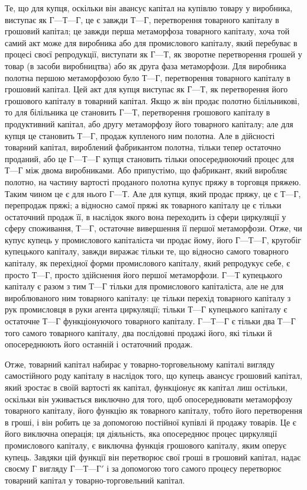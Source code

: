 Те, що для купця, оскільки він авансує капітал на купівлю
товару у виробника, виступає як $Г — Т — Г$, це є завжди $Т — Г$,
перетворення товарного капіталу в грошовий капітал; це завжди
перша метаморфоза товарного капіталу, хоча той самий акт
може для виробника або для промислового капіталу, який перебуває в процесі своєї репродукції,
виступати як $Г — Т$, як зворотне перетворення грошей у товар (в засоби виробництва) або як друга фаза
метаморфози. Для виробника полотна першою
метаморфозою було $Т — Г$, перетворення товарного капіталу
в грошовий капітал. Цей акт для купця виступає як $Г — Т$, як
перетворення його грошового капіталу в товарний капітал. Якщо ж
він продає полотно білільникові, то для білільника це становить $Г — Т$, перетворення грошового
капіталу в продуктивний
капітал, або другу метаморфозу його товарного капіталу; але
для купця це становить $Т — Г$, продаж купленого ним полотна.
Але в дійсності товарний капітал, вироблений фабрикантом полотна, тільки тепер остаточно проданий,
або це $Г — Т — Г$ купця
становить тільки опосереднюючий процес для $Т — Г$ між двома
виробниками. Або припустімо, що фабрикант, який виробляє
полотно, на частину вартості проданого полотна купує пряжу
в торговця пряжею. Таким чином це є для нього $Г — Т$. Але для
купця, який продає пряжу, це є $Т — Г$, перепродаж пряжі; а відносно самої пряжі як товарного капіталу
це є тільки остаточний
продаж її, в наслідок якого вона переходить із сфери циркуляції
у сферу споживання, $Т — Г$, остаточне вивершення її першої метаморфози. Отже, чи купує купець у
промислового капіталіста чи продає йому, його $Г — Т — Г$, кругобіг купецького капіталу, завжди
виражає тільки те, що відносно самого товарного капіталу, як перехідної форми промислового капіталу,
який
репродукує себе, є просто  $Т — Г$, просто здійснення його першої метаморфози. $Г — Т$ купецького
капіталу є разом з тим  $Т — Г$
тільки для промислового капіталіста, але не для вироблюваного
ним товарного капіталу: це тільки перехід товарного капіталу
з рук промисловця в руки агента циркуляції; тільки  $Т — Г$ купецького капіталу є остаточне  $Т — Г$
функціонуючого товарного
капіталу. $Г — Т — Г$ є тільки два  $Т — Г$ того самого товарного капіталу, два послідовні продажі його,
які тільки й опосереднюють його останній і остаточний продаж.

Отже, товарний капітал набирає у товарно-торговельному
капіталі вигляду самостійного роду капіталу в наслідок того, що
купець авансує грошовий капітал, який зростає в своїй вартості
як капітал, функціонує як капітал лиш остільки, оскільки він
уживається виключно для того, щоб опосереднювати метаморфозу товарного капіталу, його функцію як
товарного капіталу,
тобто його перетворення в гроші, і він робить це за допомогою постійної купівлі й продажу товарів.
Це є його виключна
операція; ця діяльність, яка опосереднює процес циркуляції
промислового капіталу, є виключна функція грошового капіталу,
яким оперує купець. Завдяки цій функції він перетворює свої
гроші в грошовий капітал, надає своєму $Г$ вигляду $Г — Т — Г'$
і за допомогою того самого процесу перетворює товарний капітал у товарно-торговельний капітал.

